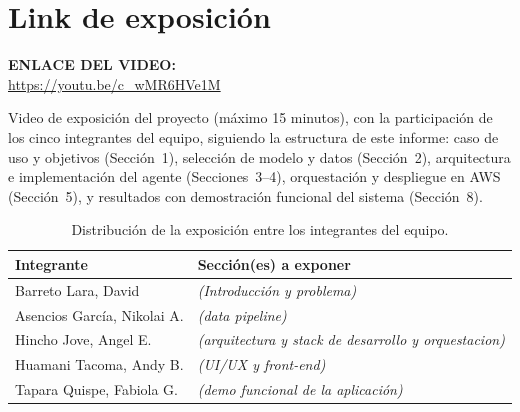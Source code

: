 \section{Link de exposici\'on}

\begin{tcolorbox}[title=Video de exposici\'on, breakable, colback=yellow!5, colframe=black!60, coltitle=black]
\centering
\vspace{0.3cm}
{\Large \textbf{ENLACE DEL VIDEO:}}\\[0.4cm]
{\large \url{https://youtu.be/c_wMR6HVe1M}}
\vspace{0.3cm}
\end{tcolorbox}

Video de exposici\'on del proyecto (m\'aximo 15 minutos), con la participaci\'on
de los cinco integrantes del equipo, siguiendo la estructura de este informe:
caso de uso y objetivos (Secci\'on~1), selecci\'on de modelo y datos
(Secci\'on~2), arquitectura e implementaci\'on del agente (Secciones~3--4),
orquestaci\'on y despliegue en AWS (Secci\'on~5), y resultados con
demostraci\'on funcional del sistema (Secci\'on~8).

\begin{table}[H]
\centering
\begin{tabular}{@{}ll@{}}
\toprule
\textbf{Integrante} & \textbf{Secci\'on(es) a exponer} \\
\midrule
Barreto Lara, David           & \emph{(Introducción y problema)} \\
Asencios Garc\'ia, Nikolai A. & \emph{(data pipeline)} \\
Hincho Jove, Angel E.         & \emph{(arquitectura y stack de desarrollo y orquestacion)} \\
Huamani Tacoma, Andy B.       & \emph{(UI/UX y front-end)} \\
Tapara Quispe, Fabiola G.     & \emph{(demo funcional de la aplicación)} \\
\bottomrule
\end{tabular}
\caption{Distribuci\'on de la exposici\'on entre los integrantes del equipo.}
\label{tab:exposicion-equipo}
\end{table}

